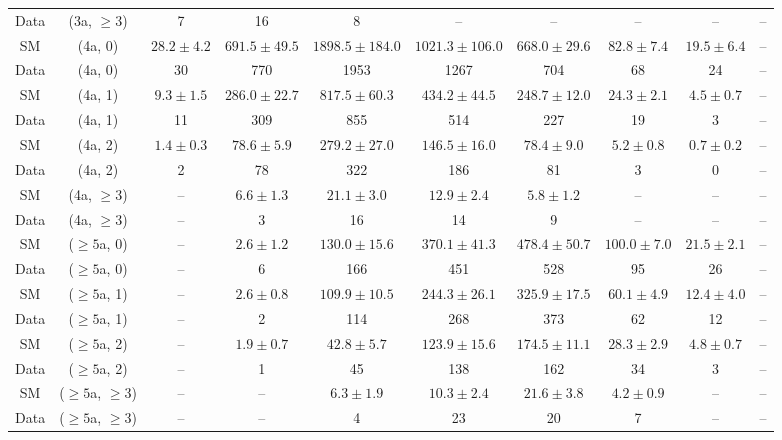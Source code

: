 \begin{table}[h!]
{\begin{tabular}{cccccccccc}
	Data & (3a, $\ge3$) & 7 & 16 & 8 & -- & -- & -- & -- & -- \\[0.5ex] 
	SM & (4a, 0) & $28.2\pm 4.2$ & $691.5\pm 49.5$ & $1898.5\pm 184.0$ & $1021.3\pm 106.0$ & $668.0\pm 29.6$ & $82.8\pm 7.4$ & $19.5\pm 6.4$ & -- \\[0.5ex] 
	Data & (4a, 0) & 30 & 770 & 1953 & 1267 & 704 & 68 & 24 & -- \\[0.5ex] 
	SM & (4a, 1) & $9.3\pm 1.5$ & $286.0\pm 22.7$ & $817.5\pm 60.3$ & $434.2\pm 44.5$ & $248.7\pm 12.0$ & $24.3\pm 2.1$ & $4.5\pm 0.7$ & -- \\[0.5ex] 
	Data & (4a, 1) & 11 & 309 & 855 & 514 & 227 & 19 & 3 & -- \\[0.5ex] 
	SM & (4a, 2) & $1.4\pm 0.3$ & $78.6\pm 5.9$ & $279.2\pm 27.0$ & $146.5\pm 16.0$ & $78.4\pm 9.0$ & $5.2\pm 0.8$ & $0.7\pm 0.2$ & -- \\[0.5ex] 
	Data & (4a, 2) & 2 & 78 & 322 & 186 & 81 & 3 & 0 & -- \\[0.5ex] 
	SM & (4a, $\ge3$) & -- & $6.6\pm 1.3$ & $21.1\pm 3.0$ & $12.9\pm 2.4$ & $5.8\pm 1.2$ & -- & -- & -- \\[0.5ex] 
	Data & (4a, $\ge3$) & -- & 3 & 16 & 14 & 9 & -- & -- & -- \\[0.5ex] 
	SM & ($\ge5$a, 0) & -- & $2.6\pm 1.2$ & $130.0\pm 15.6$ & $370.1\pm 41.3$ & $478.4\pm 50.7$ & $100.0\pm 7.0$ & $21.5\pm 2.1$ & -- \\[0.5ex] 
	Data & ($\ge5$a, 0) & -- & 6 & 166 & 451 & 528 & 95 & 26 & -- \\[0.5ex] 
	SM & ($\ge5$a, 1) & -- & $2.6\pm 0.8$ & $109.9\pm 10.5$ & $244.3\pm 26.1$ & $325.9\pm 17.5$ & $60.1\pm 4.9$ & $12.4\pm 4.0$ & -- \\[0.5ex] 
	Data & ($\ge5$a, 1) & -- & 2 & 114 & 268 & 373 & 62 & 12 & -- \\[0.5ex] 
	SM & ($\ge5$a, 2) & -- & $1.9\pm 0.7$ & $42.8\pm 5.7$ & $123.9\pm 15.6$ & $174.5\pm 11.1$ & $28.3\pm 2.9$ & $4.8\pm 0.7$ & -- \\[0.5ex] 
	Data & ($\ge5$a, 2) & -- & 1 & 45 & 138 & 162 & 34 & 3 & -- \\[0.5ex] 
	SM & ($\ge5$a, $\ge3$) & -- & -- & $6.3\pm 1.9$ & $10.3\pm 2.4$ & $21.6\pm 3.8$ & $4.2\pm 0.9$ & -- & -- \\[0.5ex] 
	Data & ($\ge5$a, $\ge3$) & -- & -- & 4 & 23 & 20 & 7 & -- & -- \\[0.5ex] 
	\hline
	\hline
\end{tabular}}
\end{table}
